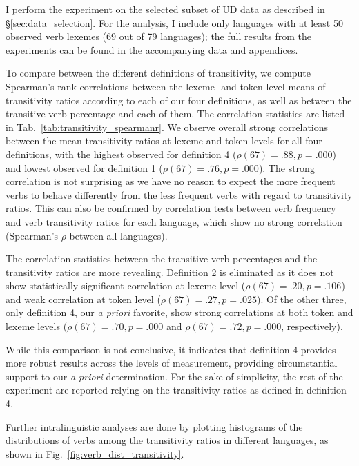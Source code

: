 I perform the experiment on the selected subset of UD data as described in §\ref{sec:data_selection}. For the analysis, I include only languages with at least 50 observed verb lexemes (69 out of 79 languages); the full results from the experiments can be found in the accompanying data and appendices. 



To compare between the different definitions of transitivity, we compute Spearman's rank correlations between the lexeme- and token-level means of transitivity ratios according to each of our four definitions, as well as between the transitive verb percentage and each of them. The correlation statistics are listed in Tab.~\ref{tab:transitivity_spearmanr}. We observe overall strong correlations between the mean transitivity ratios at lexeme and token levels for all four definitions, with the highest observed for definition 4 ($\rho(67)=.88, p=.000$) and lowest observed for definition 1 ($\rho(67)=.76, p=.000$). The strong correlation is not surprising as we have no reason to expect the more frequent verbs to behave differently from the less frequent verbs with regard to transitivity ratios. This can also be confirmed by correlation tests between verb frequency and verb transitivity ratios for each language, which show no strong correlation (Spearman's $\rho$ between all languages).

The correlation statistics between the transitive verb percentages and the transitivity ratios are more revealing. Definition 2 is eliminated as it does not show statistically significant correlation at lexeme level ($\rho(67)=.20, p=.106$) and weak correlation at token level ($\rho(67)=.27, p=.025$). Of the other three, only definition 4, our \textit{a priori} favorite, show strong correlations at both token and lexeme levels ($\rho(67)=.70, p=.000$ and $\rho(67)=.72, p=.000$, respectively). 

While this comparison is not conclusive, it indicates that definition 4 provides more robust results across the levels of measurement, providing circumstantial support to our \textit{a priori} determination. For the sake of simplicity, the rest of the experiment are reported relying on the transitivity ratios as defined in definition 4. 

Further intralinguistic analyses are done by plotting histograms of the distributions of verbs among the transitivity ratios in different languages, as shown in Fig.~\ref{fig:verb_dist_transitivity}.


